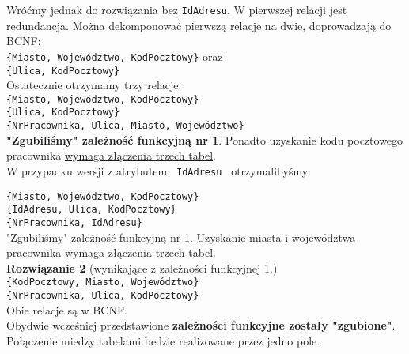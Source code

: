 \documentclass[a5paper,6pt]{article}
\begin{document}
    Wróćmy jednak do rozwiązania bez \texttt{IdAdresu}. W pierwszej relacji jest
    redundancja. Można dekomponować pierwszą relacje na dwie, doprowadzają do
    BCNF:\\
    \texttt{\{Miasto, Województwo, {\color{blue}\faKey}KodPocztowy\}} oraz\\
    \texttt{\{{\color{green}\faKey}Ulica, {\color{green}\faKey}KodPocztowy\}}\\

    Ostatecznie otrzymamy trzy relacje:\\
    \texttt{\{Miasto, Województwo, {\color{blue}\faKey}KodPocztowy\}}\\
    \texttt{\{{\color{green}\faKey}Ulica, {\color{green}\faKey}KodPocztowy\}}\\
    \texttt{\{{\color{green}\faKey}NrPracownika, Ulica, Miasto, Województwo\}}\\

    \textbf{"Zgubiliśmy" zależność funkcyjną nr 1}. Ponadto uzyskanie kodu
    pocztowego\\ pracownika \underline{wymaga złączenia trzech tabel}.\\

    W przypadku wersji z atrybutem \texttt{ IdAdresu } otrzymalibyśmy:

    \texttt{\{Miasto, Województwo, {\color{blue}\faKey}KodPocztowy\}}\\
    \texttt{\{{\color{red}\faKey}IdAdresu, {\color{blue}\faKey}Ulica,
    {\color{blue}\faKey}KodPocztowy\}}\\
    \texttt{\{{\color{green}\faKey}NrPracownika, IdAdresu\}}\\

    "Zgubiliśmy" zależność funkcyjną nr 1. Uzyskanie miasta i województwa
    pracownika \underline{wymaga złączenia trzech tabel}.\\

    \textbf{Rozwiązanie 2} (wynikające z zależności funkcyjnej 1.)\\

    \texttt{\{{\color{green}\faKey}KodPocztowy, Miasto, Województwo\}}\\
    \texttt{\{{\color{green}\faKey}NrPracownika, Ulica, KodPocztowy\}}\\

    Obie relacje są w BCNF.\\
    Obydwie wcześniej przedstawione \textbf{zależności funkcyjne zostały
    "zgubione"}.
    Połączenie miedzy tabelami bedzie realizowane przez jedno pole.\\\\
\end{document}
